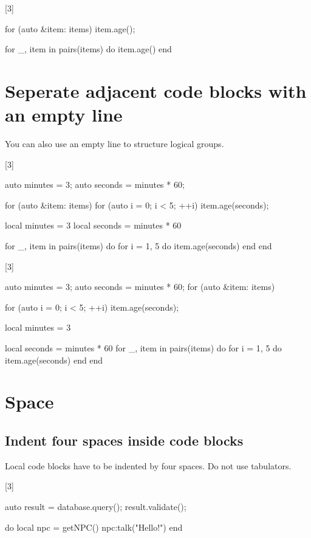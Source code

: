 \documentclass[a4paper,11pt]{scrreprt}
\newcommand{\marginMarker}[1]{%
\marginnote{%
    \hfill%
		\Huge{#1}%
}[3\baselineskip]%
}
\newcommand{\conforming}{%
\marginMarker{\textcolor{green}{\ding{51}}}%
}
\newcommand{\nonconforming}{%
\marginMarker{\textcolor{red}{\ding{55}}}%
}
\begin{document}
\nonconforming{}
\begin{cppBox}
for (auto &item: items)
{
    item.age();
}
\end{cppBox}
\begin{luaBox}
for _, item in pairs(items)
do
    item.age()
end
\end{luaBox}

\section{Seperate adjacent code blocks with an empty line}
You can also use an empty line to structure logical groups.

\conforming{}
\begin{cppBox}
auto minutes = 3;
auto seconds = minutes * 60;

for (auto &item: items) {
    for (auto i = 0; i < 5; ++i) {
        item.age(seconds);
    }
}
\end{cppBox}
\begin{luaBox}
local minutes = 3
local seconds = minutes * 60

for _, item in pairs(items) do
    for i = 1, 5 do
        item.age(seconds)
    end
end
\end{luaBox}

\nonconforming{}
\begin{cppBox}
auto minutes = 3;
auto seconds = minutes * 60;
for (auto &item: items) {

    for (auto i = 0; i < 5; ++i) {
        item.age(seconds);
    }
}
\end{cppBox}
\begin{luaBox}
local minutes = 3

local seconds = minutes * 60
for _, item in pairs(items) do
    for i = 1, 5 do
        item.age(seconds)
    end
end
\end{luaBox}

\section{Space}
\subsection{Indent four spaces inside code blocks}
Local code blocks have to be indented by four spaces. Do not use tabulators.

\conforming{}
\begin{cppBox}[showspaces]
{
    auto result = database.query();
    result.validate();
}
\end{cppBox}
\begin{luaBox}[showspaces]
do
    local npc = getNPC()
    npc:talk("Hello!")
end
\end{luaBox}
\end{document}
